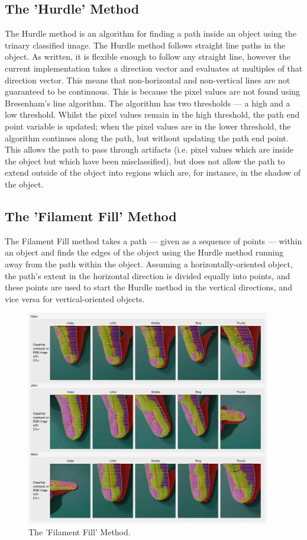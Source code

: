 \subsection{The 'Hurdle' Method}\label{sec:HurdleMethod}
The Hurdle method is an algorithm for finding a path inside an object using the trinary classified image. The Hurdle method follows straight line paths in the object. As written, it is flexible enough to follow any straight line, however the current implementation takes a direction vector and evaluates at multiples of that direction vector. This means that non-horizontal and non-vertical lines are not guaranteed to be continuous. This is because the pixel values are not found using Bresenham's line algorithm. The algorithm has two thresholds --- a high and a low threshold. Whilst the pixel values remain in the high threshold, the path end point variable is updated; when the pixel values are in the lower threshold, the algorithm continues along the path, but without updating the path end point. This allows the path to pass through artifacts (i.e. pixel values which are inside the object but which have been misclassified), but does not allow the path to extend outside of the object into regions which are, for instance, in the shadow of the object.
 
\subsection{The 'Filament Fill' Method}\label{sec:FilamentFill}
The Filament Fill method takes a path --- given as a sequence of points --- within an object and finds the edges of the object using the Hurdle method running away from the path within the object. Assuming a horizontally-oriented object, the path's extent in the horizontal direction is divided equally into points, and these points are used to start the Hurdle method in the vertical directions, and vice versa for vertical-oriented objects.


\begin{figure}[h!]
  \centering
    \includegraphics[width=0.95\textwidth]{Chapter4/Figs/FillamentFill.jpg}
    \caption{The 'Filament Fill' Method.}\label{fig:FillamentFill}
\end{figure}

